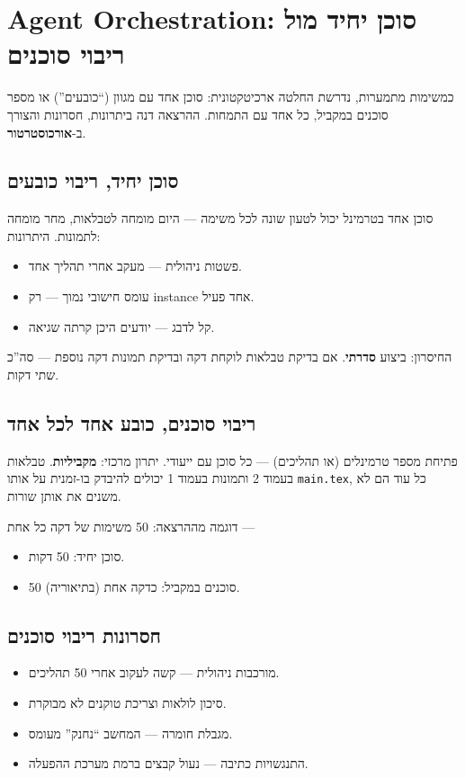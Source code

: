\section{Agent Orchestration: סוכן יחיד מול ריבוי סוכנים}

כמשימות מתמערות, נדרשת החלטה ארכיטקטונית: סוכן אחד עם מגוון 
(``כובעים'') או מספר סוכנים במקביל, כל אחד עם התמחות. ההרצאה דנה
ביתרונות, חסרונות והצורך ב-\textbf{אורכוסטרטור}.

\subsection{סוכן יחיד, ריבוי כובעים}

סוכן אחד בטרמינל יכול לטעון  שונה לכל משימה --- היום מומחה
לטבלאות, מחר מומחה לתמונות. היתרונות:
\begin{itemize}[rightmargin=2em]
  \item פשטות ניהולית --- מעקב אחרי תהליך אחד.
  \item עומס חישובי נמוך --- רק instance אחד פעיל.
  \item קל לדבג --- יודעים היכן קרתה שגיאה.
\end{itemize}

החיסרון: ביצוע \textbf{סדרתי}. אם בדיקת טבלאות לוקחת דקה ובדיקת תמונות
דקה נוספת --- סה''כ שתי דקות.

\subsection{ריבוי סוכנים, כובע אחד לכל אחד}

פתיחת מספר טרמינלים (או תהליכים) --- כל סוכן עם  ייעודי.
יתרון מרכזי: \textbf{מקביליות}. טבלאות בעמוד 2 ותמונות בעמוד 1 יכולים
להיבדק בו-זמנית על אותו \texttt{main.tex}, כל עוד הם לא משנים את אותן
שורות.

דוגמה מההרצאה: 50 משימות של דקה כל אחת ---
\begin{itemize}[rightmargin=2em]
  \item סוכן יחיד: 50 דקות.
  \item 50 סוכנים במקביל: כדקה אחת (בתיאוריה).
\end{itemize}

\subsection{חסרונות ריבוי סוכנים}

\begin{itemize}[rightmargin=2em]
  \item מורכבות ניהולית --- קשה לעקוב אחרי 50 תהליכים.
  \item סיכון לולאות וצריכת טוקנים לא מבוקרת.
  \item מגבלת חומרה --- המחשב ``נחנק'' מעומס.
  \item התנגשויות כתיבה --- נעול קבצים ברמת מערכת ההפעלה.
\end{itemize}

